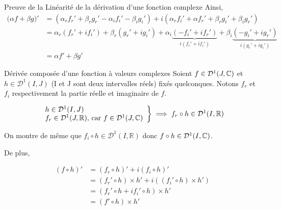 \documentclass{article}
\renewenvironment{question_kholle}[2][ ]
{
	\subsection{\texorpdfstring{#2}{}}
	\notblank{#1}
	{
		\noindent #1
		\bigbreak
	}
	{}
	\begin{proof}
}
{
	\end{proof}
}
\begin{document}
\begin{question_kholle}{Preuve de la Linéarité de la dérivation d'une fonction complexe}
  Ainsi,
  \begin{align*}
    \big( \alpha f + \beta g \big)' & = (\alpha_r f_r' + \beta_r g_r' - \alpha_i f_i' - \beta_i g_i') + i (\alpha_r f_i' +\alpha f_r' +\beta_r g_i' +\beta_i g_r')                                         \\
                                    & = \alpha_r(f_r' + if_i') + \beta_r(g_r' + ig_i') + \alpha_i \underbrace{(-f_i' + if_r')}_{i(f_r' + if_i')} + \beta_i \underbrace{( -g_i' + ig_r')}_{i(g_r' + ig_i')} \\
                                    & =\alpha f' + \beta g'
  \end{align*}
\end{question_kholle}

\begin{question_kholle}{Dérivée composée d'une fonction à valeurs complexes}
  Soient $f \in \mathcal D ^1(J, \mathbb C) $ et $h \in \mathcal D^1(I, J)$ (I et J sont deux intervalles réels) fixés quelconques. Notons $f_r$ et $f_i$ respectivement la partie réelle et imaginaire de $f$.

  \begin{align*}
    \left .
    \begin{array}{ll}
      h \in \mathcal D^1(I, J) \\
      f_r \in \mathcal D^1(J, \mathbb R) \text{, car } f \in \mathcal D^1(J, \mathbb C)
    \end{array}
    \right \}
    \implies f_r \circ h \in \mathcal D^1(I, \mathbb R)
  \end{align*}

  On montre de même que $f_i \circ h \in \mathcal D^1(I, \mathbb  R)$ donc $f \circ h \in \mathcal D^1(I, \mathbb C)$.

  De plus,

  \begin{align*}
    (f \circ h)' & = (f_r \circ h)' + i (f_i \circ h)'                       \\
                 & = (f_r' \circ h ) \times h' + i((f_i' \circ h) \times h') \\
                 & =(f_r' \circ h + if_i' \circ h) \times h'                 \\
                 & = (f' \circ h) \times h'
  \end{align*}
\end{question_kholle}
\end{document}
